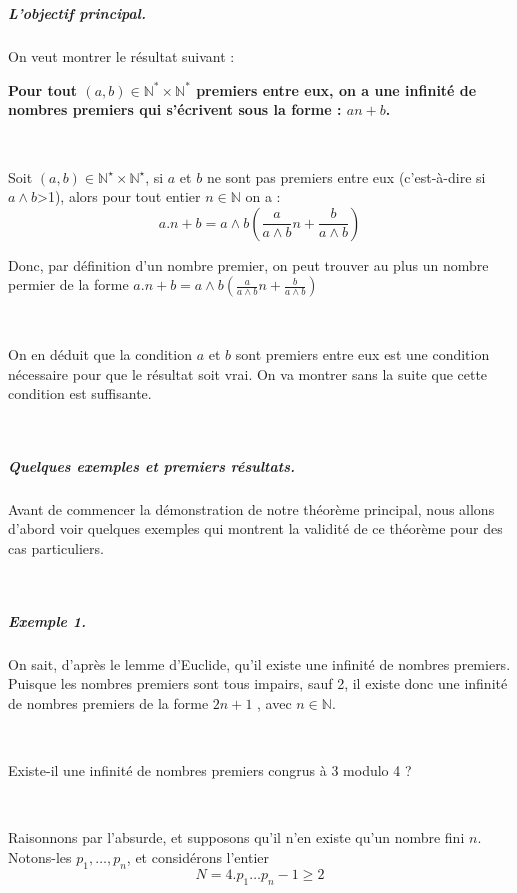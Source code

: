 \

\subparagraph{L'objectif principal.}

On veut montrer le r{\'e}sultat suivant :


\textbf{Pour tout $(a, b) \in \mathbb{N}^{\ast} \times \mathbb{N}^{\ast}$ premiers entre eux, on a une infinité de nombres premiers qui s'écrivent sous la forme : $an + b$.}


\


Soit $(a, b) \in \mathbb{N}^{\star} \times \mathbb{N}^{\star}$, si $a$ et $b$
ne sont pas premiers entre eux (c'est-{\`a}-dire si $a \wedge b$>1), alors
pour tout entier $n \in \mathbb{N}$ on a :
\[ a.n + b = a \wedge b \left( \frac{a}{a \wedge b} n + \frac{b}{a \wedge b}
   \right) \]


Donc, par d{\'e}finition d'un nombre premier, on peut trouver au plus un
nombre permier de la forme $a.n + b = a \wedge b \left( \frac{a}{a \wedge b} n
+ \frac{b}{a \wedge b} \right)$

\

On en d{\'e}duit que la condition $a$ et $b$ sont premiers entre eux est une
condition n{\'e}cessaire pour que le r{\'e}sultat soit vrai. On va montrer
sans la suite que cette condition est suffisante.

\

\subparagraph{Quelques exemples et premiers r{\'e}sultats.}

Avant de commencer la d{\'e}monstration de notre th{\'e}or{\`e}me principal,
nous allons d'abord voir quelques exemples qui montrent la validit{\'e} de ce
th{\'e}or{\`e}me pour des cas particuliers.

\

\subparagraph{Exemple 1.}

On sait, d'apr{\`e}s le lemme d'Euclide, qu'il existe une infinit{\'e} de
nombres premiers. Puisque les nombres premiers sont tous impairs, sauf 2, il
existe donc une infinit{\'e} de nombres premiers de la forme $2 n + 1$ , avec
$n \in \mathbb{N}$.

\


Existe-il une infinit{\'e} de nombres premiers congrus {\`a} 3 modulo 4 ?

\


Raisonnons par l'absurde, et supposons qu'il n'en existe qu'un nombre fini
$n$. Notons-les $p_1, \ldots, p_n$, et consid{\'e}rons l'entier
\[ N = 4. p_1 \ldots p_n - 1 \geqslant 2 \]


